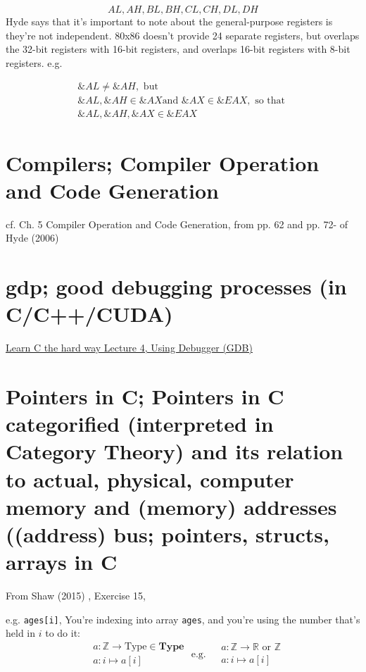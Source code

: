 \documentclass[10pt]{amsart}
\begin{document}
\begin{multicols*}{2}
\[
AL, AH, BL, BH, CL, CH, DL, DH
\]
Hyde says that it's important to note about the general-purpose registers is they're not independent.  80x86 doesn't provide 24 separate registers, but overlaps the 32-bit registers with 16-bit registers, and overlaps 16-bit registers with 8-bit registers.  e.g.

\[
\begin{gathered}
\&AL \neq \&AH, \text{ but } \\
\&AL, \&AH \in \&AX \text{and } \&AX \in \&EAX, \text{ so that } \\
\&AL , \&AH, \&AX \in \&EAX
\end{gathered}
\]

\section{Compilers; Compiler Operation and Code Generation}

cf. Ch. 5 Compiler Operation and Code Generation, from pp. 62 and pp. 72- of Hyde (2006) \cite{Hyde2006}


\section{gdp; good debugging processes (in C/C++/CUDA)}

\href{https://youtu.be/heEaKf2b1uA}{Learn C the hard way Lecture 4, Using Debugger (GDB) }


\section{Pointers in C; Pointers in C categorified (interpreted in Category Theory) and its relation to actual, physical, computer memory and (memory) addresses ((address) bus; pointers, structs, arrays in C}

From Shaw (2015) \cite{Shaw2015}, Exercise 15, 

e.g. \verb|ages[i]|, You're indexing into array \verb|ages|, and you're using the number that's held in $i$ to do it:  
\[
\begin{aligned}
& a : \mathbb{Z} \to \text{Type} \in \textbf{Type}  \\
& a: i \mapsto a[i]
\end{aligned} \text{ e.g. } 
\begin{aligned}
& a: \mathbb{Z} \to \mathbb{R} \text{ or } \mathbb{Z}  \\
& a:i \mapsto a[i]
\end{aligned}
\]


\end{multicols*}
\end{document}
